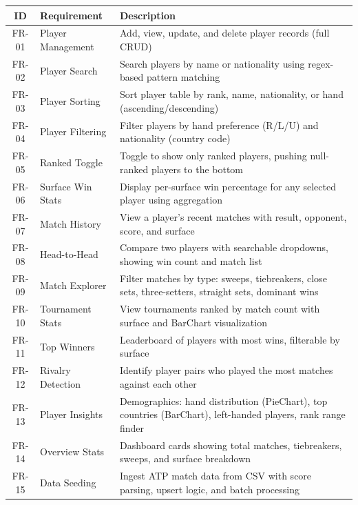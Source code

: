 \documentclass[12pt,a4paper]{article}
\begin{document}
\begin{longtable}{|c|p{3.5cm}|p{7cm}|}
    \hline
    \textbf{ID} & \textbf{Requirement} & \textbf{Description} \\
    \hline
    \endhead
    FR-01 & Player Management & Add, view, update, and delete player records (full CRUD) \\
    \hline
    FR-02 & Player Search & Search players by name or nationality using regex-based pattern matching \\
    \hline
    FR-03 & Player Sorting & Sort player table by rank, name, nationality, or hand (ascending/descending) \\
    \hline
    FR-04 & Player Filtering & Filter players by hand preference (R/L/U) and nationality (country code) \\
    \hline
    FR-05 & Ranked Toggle & Toggle to show only ranked players, pushing null-ranked players to the bottom \\
    \hline
    FR-06 & Surface Win Stats & Display per-surface win percentage for any selected player using aggregation \\
    \hline
    FR-07 & Match History & View a player's recent matches with result, opponent, score, and surface \\
    \hline
    FR-08 & Head-to-Head & Compare two players with searchable dropdowns, showing win count and match list \\
    \hline
    FR-09 & Match Explorer & Filter matches by type: sweeps, tiebreakers, close sets, three-setters, straight sets, dominant wins \\
    \hline
    FR-10 & Tournament Stats & View tournaments ranked by match count with surface and BarChart visualization \\
    \hline
    FR-11 & Top Winners & Leaderboard of players with most wins, filterable by surface \\
    \hline
    FR-12 & Rivalry Detection & Identify player pairs who played the most matches against each other \\
    \hline
    FR-13 & Player Insights & Demographics: hand distribution (PieChart), top countries (BarChart), left-handed players, rank range finder \\
    \hline
    FR-14 & Overview Stats & Dashboard cards showing total matches, tiebreakers, sweeps, and surface breakdown \\
    \hline
    FR-15 & Data Seeding & Ingest ATP match data from CSV with score parsing, upsert logic, and batch processing \\
    \hline
\end{longtable}
\end{document}

